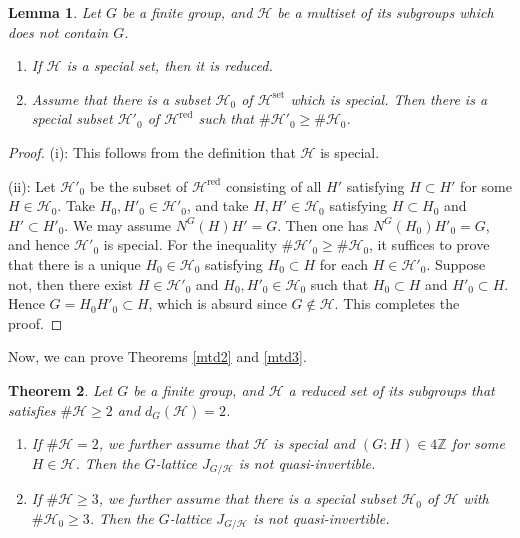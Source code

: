\documentclass[12pt]{amsart}
\theoremstyle{plain}
\newtheorem{thm}{Theorem}[section]
\newtheorem{lem}[thm]{Lemma}
\theoremstyle{definition}
\numberwithin{thm}{section}
\numberwithin{equation}{section}
\newcommand{\Z}{\mathbb{Z}}
\newcommand{\cH}{\mathcal{H}}
\DeclareMathOperator{\red}{red}
\DeclareMathOperator{\set}{set}
\begin{document}
\begin{lem}\label{lem:psrd}
Let $G$ be a finite group, and $\cH$ be a multiset of its subgroups which does not contain $G$. 
\begin{enumerate}
\item If $\cH$ is a special set, then it is reduced. 
\item Assume that there is a subset $\cH_{0}$ of $\cH^{\set}$ which is special. Then there is a special subset $\cH'_{0}$ of $\cH^{\red}$ such that $\#\cH'_{0}\geq \#\cH_{0}$. 
\end{enumerate}
\end{lem}

\begin{proof}
(i): This follows from the definition that $\cH$ is special. 

(ii): Let $\cH'_{0}$ be the subset of $\cH^{\red}$ consisting of all $H'$ satisfying $H \subset H'$ for some $H \in \cH_{0}$. Take $H_{0},H'_{0}\in \cH'_{0}$, and take $H,H'\in \cH_{0}$ satisfying $H\subset H_{0}$ and $H'\subset H'_{0}$. We may assume $N^{G}(H)H'=G$. Then one has $N^{G}(H_{0})H'_{0}=G$, and hence $\cH'_{0}$ is special. For the inequality $\#\cH'_{0}\geq \#\cH_{0}$, it suffices to prove that there is a unique $H_{0}\in \cH_{0}$ satisfying $H_{0}\subset H$ for each $H\in \cH'_{0}$. Suppose not, then there exist $H\in \cH'_{0}$ and $H_{0},H'_{0}\in \cH_{0}$ such that $H_{0}\subset H$ and $H'_{0}\subset H$. Hence $G=H_{0}H'_{0}\subset H$, which is absurd since $G\notin \cH$. This completes the proof. 
\end{proof}

Now, we can prove Theorems \ref{mtd2} and \ref{mtd3}. 

\begin{thm}\label{thm:gcdt}
Let $G$ be a finite group, and $\cH$ a reduced set of its subgroups that satisfies $\#\cH \geq 2$ and $d_{G}(\cH)=2$. 
\begin{enumerate}
    \item If $\#\cH=2$, we further assume that $\cH$ is special and $(G:H)\in 4\Z$ for some $H\in \cH$. Then the $G$-lattice $J_{G/\cH}$ is not quasi-invertible. 
    \item If $\#\cH \geq 3$, we further assume that there is a special subset $\cH_{0}$ of $\cH$ with $\#\cH_{0}\geq 3$. Then the $G$-lattice $J_{G/\cH}$ is not quasi-invertible. 
\end{enumerate}
\end{thm}

\end{document}

